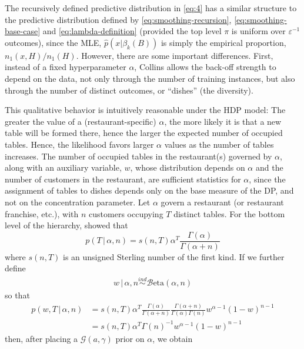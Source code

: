 \documentclass[12pt,letterpaper]{report}
\newcommand{\Gamm}[2]{\mathcal{G}(#1,#2)}
\newcommand{\Beta}[2]{\mathcal{B}\mathrm{eta}(#1,#2)}
\newcommand{\given}{\, \vert \,}
\begin{document}
The recursively defined predictive distribution 
in \eqref{eq:4} has a similar structure to the
predictive distribution defined by
\eqref{eq:smoothing-recursion}, \eqref{eq:smoothing-base-case} and
\eqref{eq:lambda-definition} (provided the top level $\pi$ is uniform over
$\varepsilon^{-1}$ outcomes), since the MLE, $\hat{p}(x \vert \beta_k(B))$
is simply the empirical proportion, $n_1(x,H) / n_1(H)$.  However,
there are some important differences.  First, 
instead of a fixed hyperparameter $\alpha$,
Collins allows the back-off strength to depend on the data, not only
through the number of training instances, but also through the
number of distinct outcomes, or ``dishes'' (the diversity).

This qualitative behavior is intuitively reasonable under the HDP model: The 
greater the value of a (restaurant-specific) $\alpha$, 
the more likely it is that a new table will be formed there, 
hence the larger the expected number of occupied tables.  Hence, the
likelihood favors larger $\alpha$ values as the number of
tables increases.  The number of occupied tables in the restaurant(s) 
governed by $\alpha$, along with
an auxiliary variable, $w$, whose distribution depends on $\alpha$ and
the number of customers in the restaurant, are sufficient statistics for
$\alpha$, since the assignment of tables to dishes depends only on the
base measure of the DP, and not on the concentration parameter.  
Let $\alpha$ govern a restaurant (or
restaurant franchise, etc.), with $n$ customers
occupying $T$ distinct tables.  For the bottom level of the hierarchy,
\citet{antoniak1974mixtures} showed that
\begin{equation}
  \label{eq:alpha-T-likelihood}
  p(T \given \alpha, n) = s(n, T) \alpha^{T} \frac{\Gamma(\alpha)}{\Gamma(\alpha + n)}
\end{equation}
where $s(n,T)$ is an unsigned
Sterling number of the first kind.  If we further define
\begin{align}
  \label{eq:w-definition}
  w \given \alpha, n \stackrel{ind}{\sim} \Beta{\alpha}{n}
\end{align}
so that
\begin{align}
  p(w, T \given \alpha, n) &= s(n, T)
  \alpha^{T} \frac{\Gamma(\alpha)}{\Gamma(\alpha + n)}
  \frac{\Gamma(\alpha + n)}{\Gamma(\alpha)\Gamma(n)} w^{\alpha -
  1} (1 - w)^{n - 1} \\
&= s(n, T)
  \alpha^{T} \Gamma(n)^{-1} w^{\alpha -
  1} (1 - w)^{n - 1}
\end{align}
then, after placing a $\Gamm{a}{\gamma}$ prior on $\alpha$, we obtain
\end{document}
